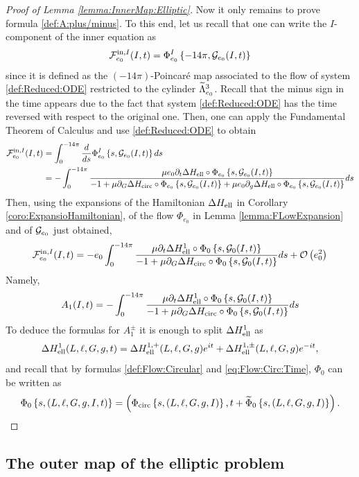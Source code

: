 \begin{proof}[Proof of Lemma \ref{lemma:InnerMap:Elliptic}]
  Now it only remains to prove formula \eqref{def:A:plus/minus}. To this end, let us recall that one can write the $I$-component of the inner equation as
\[
 \mathcal{F}_{e_0}^{\mathrm{in},I}(I,t)=\Phi_{e_0}^I\left\{-14\pi,\mathcal{G}_{e_0}(I,t)\right\}
\]
since it is defined as the $(-14\pi)$-Poincar\'e map associated to the flow of system \eqref{def:Reduced:ODE} restricted to the cylinder $\widetilde\Lambda_{e_0}^3$. Recall that the minus sign in the time appears due to the fact that system \eqref{def:Reduced:ODE} has the time reversed with respect to the original one. Then, one can apply the Fundamental Theorem of Calculus and use \eqref{def:Reduced:ODE} to obtain
\[
\begin{split}
 \mathcal{F}_{e_0}^{\mathrm{in},I}(I,t)&=\int_0^{-14\pi}\frac{d}{ds}\Phi_{e_0}^I\left\{s,\mathcal{G}_{e_0}(I,t)\right\}ds\\
&=-\int_0^{-14\pi}\frac{\mu e_0\partial_t\Delta H_{\mathrm{ell}}\circ\Phi_{e_0}\left\{s,\mathcal{G}_{e_0}(I,t)\right\}}{-1+\mu\partial_G\Delta H_{\mathrm{circ}}\circ \Phi_{e_0}\left\{s,\mathcal{G}_{e_0}(I,t)\right\}+\mu e_0\partial_g\Delta H_{\mathrm{ell}}\circ\Phi_{e_0}\left\{s,\mathcal{G}_{e_0}(I,t)\right\}}ds
\end{split}
\]
Then, using the expansions of the Hamiltonian $\Delta H_{\mathrm{ell}}$ in Corollary \ref{coro:ExpansioHamiltonian}, of the flow $\Phi_{e_0}$ in Lemma \ref{lemma:FLowExpansion} and of $\mathcal{G}_{e_0}$ just obtained,
\[
 \mathcal{F}_{e_0}^{\mathrm{in},I}(I,t)=-e_0\int_0^{-14\pi}\frac{\mu\partial_t \Delta H^1_{\mathrm{ell}}\circ\Phi_{0}\left\{s,\mathcal{G}_{0}(I,t)\right\}}{-1+\mu\partial_G\Delta H_{\mathrm{circ}}\circ \Phi_{0}\left\{s,\mathcal{G}_{0}(I,t)\right\}}ds+\mathcal{O}\left(e_0^2\right)
\]
Namely,
\[
 A_1(I,t)=-\int_0^{-14\pi}\frac{\mu \partial_t\Delta H^1_{\mathrm{ell}}\circ\Phi_{0}\left\{s,\mathcal{G}_{0}(I,t)\right\}}{-1+\mu\partial_G\Delta H_{\mathrm{circ}}\circ \Phi_{0}\left\{s,\mathcal{G}_{0}(I,t)\right\}}ds
\]
To deduce the formulas for $A_1^\pm$ it is enough to split $\Delta H_{\mathrm{ell}}^1$ as
 \[
  \Delta H_{\mathrm{ell}}^1(L,\ell,G,g,t)=\Delta H_{\mathrm{ell}}^{1,+}(L,\ell,G,g)e^{it}+\Delta H_{\mathrm{ell}}^{1,\pm}(L,\ell,G,g)e^{-it},
  \]
and recall that by formulas \eqref{def:Flow:Circular} and \eqref{eq:Flow:Circ:Time}, $\Phi_0$ can be written as
\[
 \Phi_0\left\{s, (L,\ell,G,g,I,t)\right\}=\left(\Phi_{\mathrm{circ}}\left\{s, (L,\ell,G,g,I)\right\},t+\widetilde\Phi_0\left\{s, (L,\ell,G,g,I)\right\}\right).
\]
\end{proof}

\subsection{The outer map of the elliptic problem}\label{sec:Ell:Outer}

